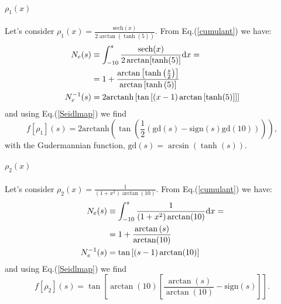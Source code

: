 \documentclass[aps,pra,twocolumn,superscriptaddress]{revtex4}
\providecommand{\N}{{\mathbb{N}}}
\begin{document}
\paragraph{$\rho_1(x)$}Let's consider $\rho_1(x)=\frac{\text{sech}(x)}{2\arctan(\tanh(5))}$. From Eq.(\ref{cumulant}) we have:
\begin{equation}
\begin{aligned}
N_e(s)&\equiv\int_{-10}^s\frac{\text{sech}(x)}{2\arctan[\tanh(5)]}\text{\rm{d}}x=\\&=1+\frac{\arctan\left[\tanh\left(\frac{s}{2}\right)\right]}{\arctan\left[\tanh\left(5\right)\right]}\\N_e^{-1}(s)&=2\text{arctanh}\left[\tan\left[(x-1)\arctan\left[\tanh(5)\right]\right]\right]
\end{aligned}
\end{equation}and using Eq.(\ref{Seidlmap}) we find \begin{equation}
f[\rho_1](s)=2\text{arctanh}\left(\tan\left(\frac{1}{2}\left(\text{gd}(s)-\text{sign}(s)\text{gd}(10)\right)\right)\right),
\end{equation} with the Gudermannian function, $\text{gd}(s)=\arcsin(\tanh(s))$.
\paragraph{$\rho_2(x)$}Let's consider $\rho_2(x)=\frac{1}{(1+x^2)\arctan(10)}$. From Eq.(\ref{cumulant}) we have:
\begin{equation}
\begin{aligned}
N_e(s)&\equiv\int_{-10}^s\frac{1}{(1+x^2)\arctan(10)}\text{\rm{d}}x=\\&=1+\frac{\arctan\left(s\right)}{\arctan(10)}\\N_e^{-1}(s)&=\tan\left[(s-1)\arctan(10)\right]
\end{aligned}
\end{equation}and using Eq.(\ref{Seidlmap}) we find \begin{equation}
f[\rho_2](s)=\tan\left[\arctan\left(10\right)\left[\frac{\arctan(s)}{\arctan(10)}-\text{sign}(s)\right]\right].
\end{equation}


\end{document}
